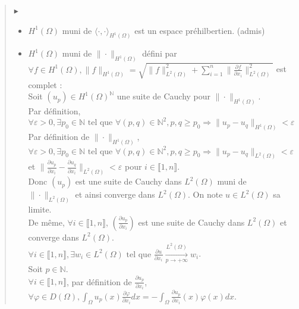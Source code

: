\documentclass[12pt,a4paper]{article}
\newcommand{\preuve}[1]{%
    \begin{quote}
        $\blacktriangleright$~#1
    \end{quote}
}
\begin{document}
\preuve{
    \begin{itemize}
        \item $H^1(\Omega)$ muni de $\langle \cdot, \cdot \rangle_{H^1(\Omega)}$ est un espace préhilbertien. (admis)
        \item $H^1(\Omega)$ muni de $\| \cdot \|_{H^1(\Omega)}$ défini par $\forall f \in H^1(\Omega), \| f \|_{H^1(\Omega)} = \sqrt{\| f \|_{L^2(\Omega)}^2 + \sum_{i=1}^n \| \frac{\partial f}{\partial x_i} \|_{L^2(\Omega)}^2}$ est complet : \\
        
        Soit $(u_p) \in H^1(\Omega)^{\mathbb{N}}$ une suite de Cauchy pour $\| \cdot \|_{H^1(\Omega)}$. \\
        Par définition, \\
        $\forall \varepsilon > 0, \exists p_0 \in \mathbb{N} \text{ tel que } \forall (p, q) \in \mathbb{N}^2, p, q \geq p_0 \Rightarrow \| u_p - u_q \|_{H^1(\Omega)} < \varepsilon$ \\

        Par définition de $\| \cdot \|_{H^1(\Omega)}$, \\
        $\forall \varepsilon > 0, \exists p_0 \in \mathbb{N} \text{ tel que } \forall (p, q) \in \mathbb{N}^2, p, q \geq p_0 \Rightarrow \| u_p - u_q \|_{L^2(\Omega)} < \varepsilon$ et $\| \frac{\partial u_p}{\partial x_i} - \frac{\partial u_q}{\partial x_i} \|_{L^2(\Omega)} < \varepsilon$ pour $i \in \llbracket 1, n \rrbracket$. \\

        Donc $(u_p)$ est une suite de Cauchy dans $L^2(\Omega)$ muni de $\| \cdot \|_{L^2(\Omega)}$ et ainsi converge dans $L^2(\Omega)$. On note $u \in L^2(\Omega)$ sa limite. \\

        De même, $\forall i \in \llbracket 1, n \rrbracket$, $(\frac{\partial u_p}{\partial x_i})$ est une suite de Cauchy dans $L^2(\Omega)$ et converge dans $L^2(\Omega)$. \\
        $\forall i \in \llbracket 1, n \rrbracket, \exists w_i \in L^2(\Omega) \text{ tel que } \frac{\partial u}{\partial x_i} \xrightarrow[p \rightarrow +\infty]{L^2(\Omega)} w_i$. \\

        Soit $p \in \mathbb{N}$. \\
        $\forall i \in \llbracket 1, n \rrbracket$, par définition de $\frac{\partial u_p}{\partial x_i}$, \\
        $\forall \varphi \in D(\Omega), \int_{\Omega} u_p(x) \frac{\partial \varphi}{\partial x_i} dx = - \int_{\Omega} \frac{\partial u_p}{\partial x_i}(x) \varphi(x) dx$. \\


\end{itemize}}
\end{document}
